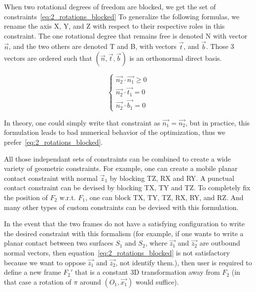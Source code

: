\begin{itemize}
When two rotational degrees of freedom are blocked, we get the set of constraints~\ref{eq:2_rotations_blocked}
To generalize the following formulas, we rename the axis X, Y, and Z with respect to their respective roles in this constraint.
The one rotational degree that remains free is denoted N with vector $\vec{n}$, and the two others are denoted T and B, with vectors $\vec{t}$, and $\vec{b}$.
Those 3 vectors are ordered such that $(\vec{n}, \vec{t}, \vec{b})$ is an orthonormal direct basis.

\begin{equation}
\label{eq:2_rotations_blocked}
\begin{cases}
  \vec{n_2}\cdot\vec{n_1} \geq 0 \\
  \vec{n_2}\cdot\vec{t_1} = 0 \\
  \vec{n_2}\cdot\vec{b_1} = 0
\end{cases}
\end{equation}

In theory, one could simply write that constraint as $\vec{n_1}=\vec{n_2}$, but in practice, this formulation leads to bad numerical behavior of the optimization, thus we prefer~\ref{eq:2_rotations_blocked}.

All those independant sets of constraints can be combined to create a wide variety of geometric constraints.
For example, one can create a mobile planar contact constraint with normal $\vec{z}_1$ by blocking TZ, RX and RY.
A punctual contact constraint can be devised by blocking TX, TY and TZ.
To completely fix the position of $F_2$ w.r.t. $F_1$, one can block TX, TY, TZ, RX, RY, and RZ.
And many other types of custom constraints can be devised with this formulation.

In the event that the two frames do not have a satisfying configuration to write the desired constraint with this formalism (for example, if one wants to write a planar contact between two surfaces $S_1$ and $S_2$, where $\vec{z_1}$ and $\vec{z_2}$ are outbound normal vectors, then equation~\ref{eq:2_rotations_blocked} is not satisfactory because we want to oppose $\vec{z_1}$ and $\vec{z_2}$, not identify them.), then user is required to define a new frame $F_2'$ that is a constant 3D transformation away from $F_2$ (in that case a rotation of $\pi$ around $(O_1,\vec{x_1})$ would suffice).


\end{itemize}
